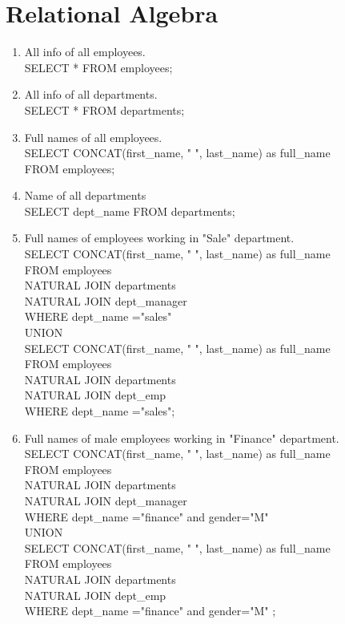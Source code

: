 \documentclass{article}
\begin{document}
\section*{Relational Algebra}
\begin{enumerate}
	\item All info of all employees.\\
	
	 SELECT * FROM employees;	
	
	\item All info of all departments.\\

	 SELECT * FROM departments;	
	
	\item Full names of all employees.\\
	
	SELECT CONCAT(first\_name, " ", last\_name) as full\_name\\ FROM employees;
	
	\item Name of all departments\\
	
	SELECT dept\_name FROM departments;	
	
	\item Full names of employees working in "Sale" department.\\
	
	SELECT CONCAT(first\_name, " ", last\_name) as full\_name\\
	FROM employees\\
	NATURAL JOIN departments\\ 
	NATURAL JOIN dept\_manager\\
	WHERE dept\_name ="sales"\\
	UNION \\
	SELECT CONCAT(first\_name, " ", last\_name) as full\_name\\ 
	FROM employees\\ 
	NATURAL JOIN departments\\ 
	NATURAL JOIN dept\_emp\\
	WHERE dept\_name ="sales";
		
	\item Full names of male employees working in "Finance" department.\\
	
	SELECT CONCAT(first\_name, " ", last\_name) as full\_name\\
	FROM employees\\
	NATURAL JOIN departments\\ 
	NATURAL JOIN dept\_manager\\
	WHERE dept\_name ="finance" and gender="M" \\
	UNION \\
	SELECT CONCAT(first\_name, " ", last\_name) as full\_name\\ 
	FROM employees\\ 
	NATURAL JOIN departments\\ 
	NATURAL JOIN dept\_emp\\
	WHERE dept\_name ="finance" and gender="M" ;
	

\end{enumerate}
\end{document}
